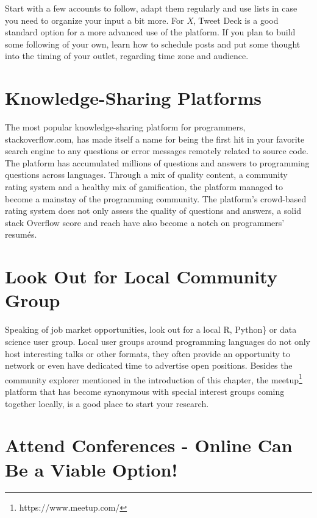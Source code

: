 \documentclass[
  12pt,
  letterpaper,
]{krantz}
\begin{document}
Start with a few accounts to follow, adapt them regularly and use lists
in case you need to organize your input a bit more. For \emph{X}, Tweet
Deck is a good standard option for a more advanced use of the platform.
If you plan to build some following of your own, learn how to schedule
posts and put some thought into the timing of your outlet, regarding
time zone and audience.

\hypertarget{knowledge-sharing-platforms}{%
\section{Knowledge-Sharing
Platforms}\label{knowledge-sharing-platforms}}

The most popular knowledge-sharing platform for programmers,
stackoverflow.com, has made itself a name for being the
first hit in your favorite search engine to any questions or error
messages remotely related to source code. The platform has accumulated
millions of questions and answers to programming questions across
languages. Through a mix of quality content, a community rating system
and a healthy mix of gamification, the platform managed to become a
mainstay of the programming community. The platform's crowd-based rating
system does not only assess the quality of questions and answers, a
solid stack Overflow score and reach have also become a
notch on programmers' resumés.

\hypertarget{look-out-for-local-community-group}{%
\section{Look Out for Local Community
Group}\label{look-out-for-local-community-group}}

Speaking of job market opportunities, look out for a local R,
Python\} or data science user group. Local user groups
around programming languages do not only host interesting talks or other
formats, they often provide an opportunity to network or even have
dedicated time to advertise open positions. Besides the community
explorer mentioned in the introduction of this chapter, the
meetup\footnote{https://www.meetup.com/} platform that has become
synonymous with special interest groups coming together locally, is a
good place to start your research.

\hypertarget{attend-conferences---online-can-be-a-viable-option}{%
\section{Attend Conferences - Online Can Be a Viable
Option!}\label{attend-conferences---online-can-be-a-viable-option}}
\end{document}
